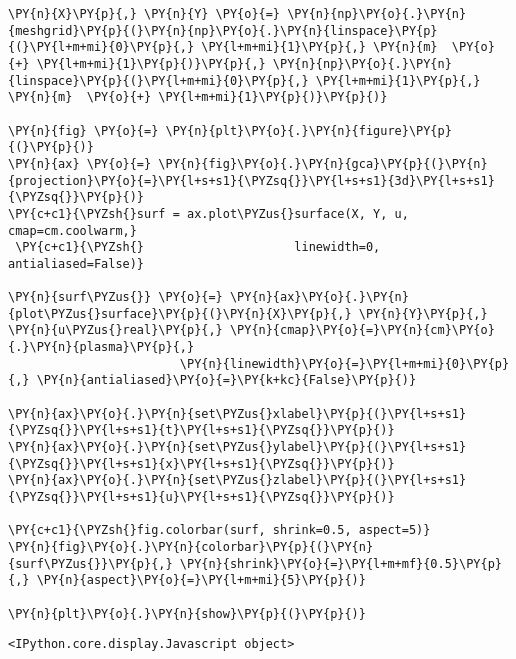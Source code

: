     \begin{tcolorbox}[breakable, size=fbox, boxrule=1pt, pad at break*=1mm,colback=cellbackground, colframe=cellborder]
\begin{Verbatim}[commandchars=\\\{\}]
\PY{n}{X}\PY{p}{,} \PY{n}{Y} \PY{o}{=} \PY{n}{np}\PY{o}{.}\PY{n}{meshgrid}\PY{p}{(}\PY{n}{np}\PY{o}{.}\PY{n}{linspace}\PY{p}{(}\PY{l+m+mi}{0}\PY{p}{,} \PY{l+m+mi}{1}\PY{p}{,} \PY{n}{m}  \PY{o}{+} \PY{l+m+mi}{1}\PY{p}{)}\PY{p}{,} \PY{n}{np}\PY{o}{.}\PY{n}{linspace}\PY{p}{(}\PY{l+m+mi}{0}\PY{p}{,} \PY{l+m+mi}{1}\PY{p}{,} \PY{n}{m}  \PY{o}{+} \PY{l+m+mi}{1}\PY{p}{)}\PY{p}{)}

\PY{n}{fig} \PY{o}{=} \PY{n}{plt}\PY{o}{.}\PY{n}{figure}\PY{p}{(}\PY{p}{)}
\PY{n}{ax} \PY{o}{=} \PY{n}{fig}\PY{o}{.}\PY{n}{gca}\PY{p}{(}\PY{n}{projection}\PY{o}{=}\PY{l+s+s1}{\PYZsq{}}\PY{l+s+s1}{3d}\PY{l+s+s1}{\PYZsq{}}\PY{p}{)}
\PY{c+c1}{\PYZsh{}surf = ax.plot\PYZus{}surface(X, Y, u, cmap=cm.coolwarm,}
 \PY{c+c1}{\PYZsh{}                     linewidth=0, antialiased=False)}

\PY{n}{surf\PYZus{}} \PY{o}{=} \PY{n}{ax}\PY{o}{.}\PY{n}{plot\PYZus{}surface}\PY{p}{(}\PY{n}{X}\PY{p}{,} \PY{n}{Y}\PY{p}{,} \PY{n}{u\PYZus{}real}\PY{p}{,} \PY{n}{cmap}\PY{o}{=}\PY{n}{cm}\PY{o}{.}\PY{n}{plasma}\PY{p}{,}
                        \PY{n}{linewidth}\PY{o}{=}\PY{l+m+mi}{0}\PY{p}{,} \PY{n}{antialiased}\PY{o}{=}\PY{k+kc}{False}\PY{p}{)}

\PY{n}{ax}\PY{o}{.}\PY{n}{set\PYZus{}xlabel}\PY{p}{(}\PY{l+s+s1}{\PYZsq{}}\PY{l+s+s1}{t}\PY{l+s+s1}{\PYZsq{}}\PY{p}{)}
\PY{n}{ax}\PY{o}{.}\PY{n}{set\PYZus{}ylabel}\PY{p}{(}\PY{l+s+s1}{\PYZsq{}}\PY{l+s+s1}{x}\PY{l+s+s1}{\PYZsq{}}\PY{p}{)}
\PY{n}{ax}\PY{o}{.}\PY{n}{set\PYZus{}zlabel}\PY{p}{(}\PY{l+s+s1}{\PYZsq{}}\PY{l+s+s1}{u}\PY{l+s+s1}{\PYZsq{}}\PY{p}{)}

\PY{c+c1}{\PYZsh{}fig.colorbar(surf, shrink=0.5, aspect=5)}
\PY{n}{fig}\PY{o}{.}\PY{n}{colorbar}\PY{p}{(}\PY{n}{surf\PYZus{}}\PY{p}{,} \PY{n}{shrink}\PY{o}{=}\PY{l+m+mf}{0.5}\PY{p}{,} \PY{n}{aspect}\PY{o}{=}\PY{l+m+mi}{5}\PY{p}{)}

\PY{n}{plt}\PY{o}{.}\PY{n}{show}\PY{p}{(}\PY{p}{)}
\end{Verbatim}
\end{tcolorbox}

    
    \begin{verbatim}
<IPython.core.display.Javascript object>
    \end{verbatim}

